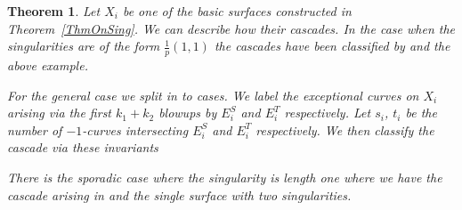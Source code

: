 \documentclass[12pt,a4paper]{book}      %
\newtheorem{thm}{Theorem}[section]
\theoremstyle{definition}
\begin{document}
\begin{thm}\label{Cascade Theorem}
Let $X_i$ be one of the basic surfaces constructed in Theorem~\ref{ThmOnSing}. We can describe how their cascades. In the case when the singularities are of the form $\frac{1}{p}(1,1)$ the cascades have been classified by \cite{CP} and the above example. 

For the general case we split in to cases. We label the exceptional curves on $X_i$ arising via the first $k_1+k_2$ blowups by $E_i^S$ and $E_i^T$ respectively. Let $s_i$, $t_i$ be the number of $-1$-curves intersecting $E_i^S$ and $E_i^T$ respectively. We then classify the cascade via these invariants


There is the sporadic case where the singularity is length one where we have the cascade arising in \cite{CP} and the single surface with two singularities.


\end{thm}
\end{document}
